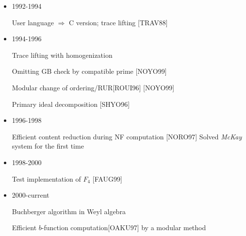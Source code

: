 \documentclass{slides}
\begin{document}
\begin{slide}{}

\begin{itemize}
\item 1992-1994

User language $\Rightarrow$ C version; trace lifting [TRAV88]

\item 1994-1996

Trace lifting with homogenization

Omitting GB check by compatible prime [NOYO99]

Modular change of ordering/RUR[ROUI96] [NOYO99]

Primary ideal decomposition [SHYO96]

\item 1996-1998

Efficient content reduction during NF computation [NORO97]
Solved {\it McKay} system for the first time

\item 1998-2000

Test implementation of $F_4$ [FAUG99]

\item 2000-current

Buchberger algorithm in Weyl algebra

Efficient $b$-function computation[OAKU97] by a modular method
\end{itemize}
\end{slide}
\end{document}
